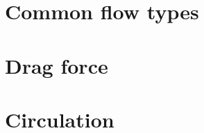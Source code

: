 \documentclass[12pt]{report}
\begin{document}

%

\chapter{Common flow types}



\chapter{Drag force}



\chapter{Circulation}




%


%

\end{document}
